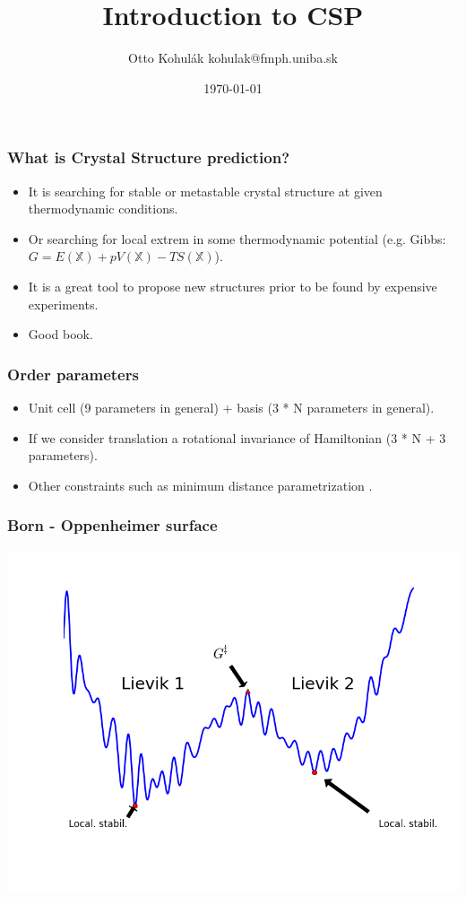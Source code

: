 \documentclass{beamer}
\begin{document}
\title{Introduction to CSP}   
\author{Otto Kohul\'{a}k \newline kohulak@fmph.uniba.sk} 
\date{\today} 

\frame{\titlepage} 

\begin{frame}
  \frametitle{What is Crystal Structure prediction?}
  \begin{itemize}
    \item It is searching for stable or metastable crystal structure at given thermodynamic conditions.
    \item Or searching for local extrem in some thermodynamic potential (e.g. Gibbs: $ G = E(\mathbb{X}) + pV(\mathbb{X}) - TS(\mathbb{X}) $).
    \item It is a great tool to propose new structures prior to be found by expensive experiments.
    \item Good book\cite{oganov2011}.
  \end{itemize}
\end{frame}

\begin{frame}
  \frametitle{Order parameters}
  \begin{itemize}
    \item Unit cell (9 parameters in general) + basis (3 * N parameters in general).
    \item If we consider translation a rotational invariance of Hamiltonian (3 * N + 3 parameters).
    \item Other constraints such as minimum distance parametrization \cite{pauschenwein2009}.
  \end{itemize}
\end{frame}

\begin{frame}
  \frametitle{Born - Oppenheimer surface}
  \includegraphics[width=\textwidth]{figs/Lievik.png}
\end{frame}
\end{document}
